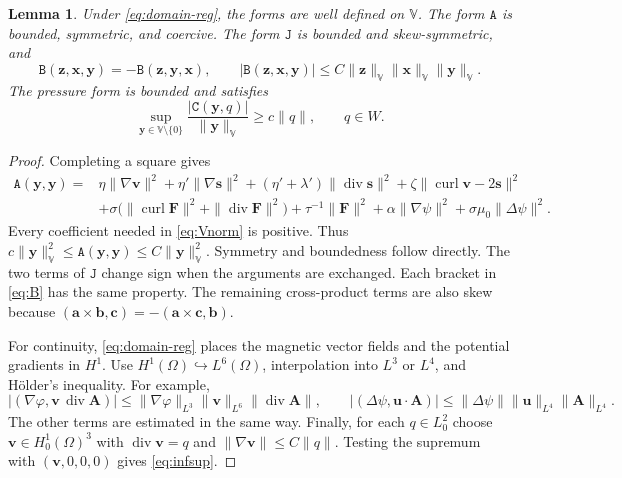 \documentclass[11pt,a4paper]{article}
\newcommand{\bs}{\boldsymbol}
\DeclareMathOperator{\curl}{curl}
\DeclareMathOperator{\ddiv}{div}
\newcommand{\Div}{\ddiv}
\newcommand{\V}{\mathbb V}
\newcommand{\Aform}{\mathtt A}
\newcommand{\JJ}{\mathtt J}
\newcommand{\BB}{\mathtt B}
\newcommand{\CC}{\mathtt C}
\newtheorem{lemma}[lemma]{Lemma}
\theoremstyle{definition}
\numberwithin{equation}{section}
\begin{document}
\begin{lemma}\label{lem:forms}
Under \eqref{eq:domain-reg}, the forms are well defined on $\V$. The form $\Aform$ is bounded, symmetric, and coercive. The form $\JJ$ is bounded and skew-symmetric, and
\begin{equation}\label{eq:skew}
 \BB(\bs z,\bs x,\bs y)=-\BB(\bs z,\bs y,\bs x),\qquad
 |\BB(\bs z,\bs x,\bs y)|\le C\|\bs z\|_{\V}\|\bs x\|_{\V}\|\bs y\|_{\V}.
\end{equation}
The pressure form is bounded and satisfies
\begin{equation}\label{eq:infsup}
 \sup_{\bs y\in\V\setminus\{0\}}\frac{|\CC(\bs y,q)|}{\|\bs y\|_{\V}}
 \ge c\|q\|,\qquad q\in W.
\end{equation}
\end{lemma}
\begin{proof}
Completing a square gives
\begin{equation}\label{eq:A-square}
\begin{aligned}
 \Aform(\bs y,\bs y)={}&\eta\|\nabla\bs v\|^2+\eta'\|\nabla\bs s\|^2
 +(\eta'+\lambda')\|\Div\bs s\|^2+\zeta\|\curl\bs v-2\bs s\|^2\\
 &+\sigma\bigl(\|\curl\bs F\|^2+\|\Div\bs F\|^2\bigr)+\tau^{-1}\|\bs F\|^2
 +\alpha\|\nabla\psi\|^2+\sigma\mu_0\|\Delta\psi\|^2.
\end{aligned}
\end{equation}
Every coefficient needed in \eqref{eq:Vnorm} is positive. Thus
$c\|\bs y\|_{\V}^2\le\Aform(\bs y,\bs y)\le C\|\bs y\|_{\V}^2$.
Symmetry and boundedness follow directly. The two terms of $\JJ$ change sign when the arguments are exchanged. Each bracket in \eqref{eq:B} has the same property. The remaining cross-product terms are also skew because $(\bs a\times\bs b,\bs c)=-(\bs a\times\bs c,\bs b)$.

For continuity, \eqref{eq:domain-reg} places the magnetic vector fields and the potential gradients in $H^1$. Use $H^1(\Omega)\hookrightarrow L^6(\Omega)$, interpolation into $L^3$ or $L^4$, and H\"older's inequality. For example,
\[
 |(\nabla\varphi,\bs v\,\Div\bs A)|
 \le\|\nabla\varphi\|_{L^3}\|\bs v\|_{L^6}\|\Div\bs A\|,
 \qquad
 |(\Delta\psi,\bs u\cdot\bs A)|
 \le\|\Delta\psi\|\|\bs u\|_{L^4}\|\bs A\|_{L^4}.
\]
The other terms are estimated in the same way. Finally, for each $q\in L_0^2$ choose $\bs v\in H_0^1(\Omega)^3$ with $\Div\bs v=q$ and $\|\nabla\bs v\|\le C\|q\|$. Testing the supremum with $(\bs v,0,0,0)$ gives \eqref{eq:infsup}.
\end{proof}
\end{document}
